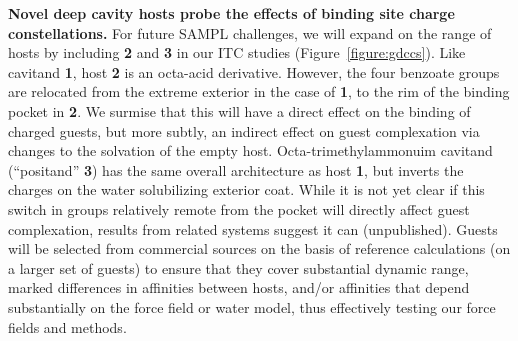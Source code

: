 \documentclass[11pt]{article}
\begin{document}
{\bf Novel deep cavity hosts probe the effects of binding site charge constellations.} 
For future SAMPL challenges, we will expand on the range of hosts by including {\bf 2} and {\bf 3} in our ITC studies (Figure~\ref{figure:gdccs}).  
Like cavitand {\bf 1}, host {\bf 2} is an octa-acid derivative.  However, the four benzoate groups are relocated from the extreme exterior in the case of {\bf 1}, to the rim of the binding pocket in {\bf 2}.  
We surmise that this will have a direct effect on the binding of charged guests, but more subtly, an indirect effect on guest complexation via changes to the solvation of the empty host.  
Octa-trimethylammonuim cavitand (``positand'' {\bf 3}) has the same overall architecture as host {\bf 1}, but inverts the charges on the water solubilizing exterior coat.  
While it is not yet clear if this switch in groups relatively remote from the pocket will directly affect guest complexation, results from related systems suggest it can (unpublished). 
Guests will be selected from commercial sources on the basis of reference calculations (on a larger set of guests) to ensure that they cover substantial dynamic range, marked differences in affinities between hosts, and/or affinities that depend substantially on the force field or water model, thus effectively testing our force fields and methods.
\end{document}
